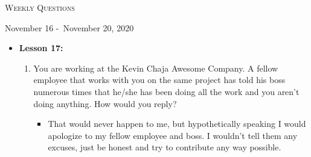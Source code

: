 \centerline{\LARGE\textsc{Weekly Questions}}
\centerline{November 16 -\ November 20, 2020}
\textbf{}
\begin{itemize}
  \item[] \textbf{\large Lesson 17:}
  \begin{enumerate}
    \item You are working at the Kevin Chaja Awesome Company. A fellow
    employee that works with you on the same project has told his boss
    numerous times that he/she has been doing all the work and you aren't
    doing anything. How would you reply?
    \begin{itemize}
      \item That would never happen to me, but hypothetically speaking I would apologize 
      to my fellow employee and boss. I wouldn't tell them any excuses, just be honest 
      and try to contribute any way possible.
    \end{itemize}
  \end{enumerate} 
\end{itemize}
